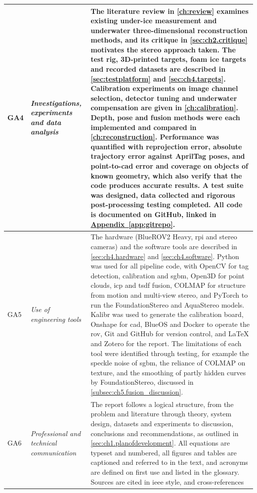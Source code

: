 {\begin{longtable}{>{\raggedright\arraybackslash}p{} >{\raggedright\arraybackslash}p{} >{\noindent\justifying\arraybackslash}p{}}
\cmidrule(lr){1-3}
GA4 & \textit{Investigations, experiments and data analysis} &
The literature review in \autoref{ch:review} examines existing under-ice measurement and underwater three-dimensional
reconstruction methods, and its critique in \autoref{sec:ch2.critique} motivates the stereo approach taken. The test
rig, 3D-printed targets, foam ice targets and recorded datasets are described in \autoref{sec:testplatform} and \autoref{sec:ch4.targets}. Calibration
experiments on image channel selection, detector tuning and underwater compensation are given in
\autoref{ch:calibration}. Depth, pose and fusion methods were each implemented and compared in
\autoref{ch:reconstruction}. Performance was quantified with reprojection error, absolute trajectory error against
AprilTag poses, and point-to-\acrshort{cad} error and coverage on objects of known geometry, which also verify that the code
produces accurate results. A test suite was designed, data collected and rigorous post-processing testing completed.
 All code is documented on GitHub, linked in \hyperref[app:gitrepo]{Appendix~\ref*{app:gitrepo}}. \\
\cmidrule(lr){1-3}
GA5 & \textit{Use of engineering tools} &
The hardware (BlueROV2 Heavy, \acrshort{rpi} and stereo cameras) and the software tools are described in
\autoref{sec:ch4.hardware} and \autoref{sec:ch4.software}. Python was used for all pipeline code, with OpenCV for
tag detection, calibration and \acrshort{sgbm}, Open3D for point clouds, \acrshort{icp} and \acrshort{tsdf} fusion, COLMAP for structure from motion
and multi-view stereo, and PyTorch to run the FoundationStereo and AquaStereo models. Kalibr was used to generate
the calibration board, Onshape for \acrshort{cad}, BlueOS and Docker to operate the \acrshort{rov}, Git and GitHub for version control,
and \LaTeX{} and Zotero for the report. The limitations of each tool were identified through testing, for example
the speckle noise of \acrshort{sgbm}, the reliance of COLMAP on texture, and the smoothing of partly hidden curves by
FoundationStereo, discussed in \autoref{subsec:ch5.fusion_discussion}. \\
\cmidrule(lr){1-3}
GA6 & \textit{Professional and technical communication} &
The report follows a logical structure, from the problem and literature through theory, system design, datasets
and experiments to discussion, conclusions and recommendations, as outlined in \autoref{sec:ch1.planofdevelopment}. All
equations are typeset and numbered, all figures and tables are captioned and referred to in the text, and
acronyms are defined on first use and listed in the glossary. Sources are cited in \acrshort{ieee} style, and cross-references

\end{longtable}}
